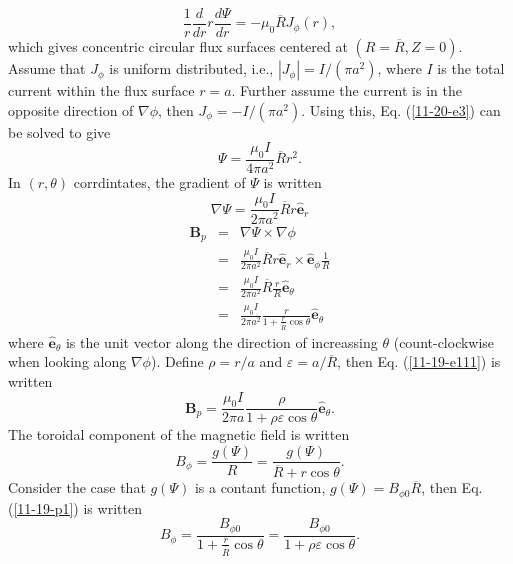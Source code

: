 \documentclass{article}
\begin{document}
\begin{equation}
  \label{11-20-e3} \frac{1}{r}  \frac{d}{d r} r \frac{d \Psi}{d r} = - \mu_0
  \overline{R} J_{\phi} (r),
\end{equation}
which gives concentric circular flux surfaces centered at $(R = \overline{R},
Z = 0)$. Assume that $J_{\phi}$ is uniform distributed, i.e., $|J_{\phi} | = I
/ (\pi a^2)$, where $I$ is the total current within the flux surface $r = a$.
Further assume the current is in the opposite direction of $\nabla \phi$, then
$J_{\phi} = - I / (\pi a^2)$. Using this, Eq. (\ref{11-20-e3}) can be solved
to give
\begin{equation}
  \label{11-21-4} \Psi = \frac{\mu_0 I}{4 \pi a^2} \overline{R} r^2 .
\end{equation}
In $(r, \theta)$ corrdintates, the gradient of $\Psi$ is written
\begin{equation}
  \nabla \Psi = \frac{\mu_0 I}{2 \pi a^2} \overline{R} r \hat{\mathbf{e}}_r
\end{equation}
\begin{eqnarray}
  \mathbf{B}_p & = & \nabla \Psi \times \nabla \phi \nonumber\\
  & = &  \frac{\mu_0 I}{2 \pi a^2} \overline{R} r \hat{\mathbf{e}}_r \times
  \hat{\mathbf{e}}_{\phi} \frac{1}{R} \nonumber\\
  & = & \frac{\mu_0 I}{2 \pi a^2} \overline{R} \frac{r}{R}
  \hat{\mathbf{e}}_{\theta} \nonumber\\
  & = & \frac{\mu_0 I}{2 \pi a^2} \frac{r}{1 + \frac{r}{\overline{R}} \cos
  \theta} \hat{\mathbf{e}}_{\theta}  \label{11-19-e111}
\end{eqnarray}
where $\hat{\mathbf{e}}_{\theta}$ is the unit vector along the direction of
increassing $\theta$ (count-clockwise when looking along $\nabla \phi$).
Define $\rho = r / a$ and $\varepsilon = a / \overline{R}$, then Eq.
(\ref{11-19-e111}) is written
\[ \mathbf{B}_p = \frac{\mu_0 I}{2 \pi a} \frac{\rho}{1 + \rho \varepsilon
   \cos \theta} \hat{\mathbf{e}}_{\theta} . \]
The toroidal component of the magnetic field is written
\begin{equation}
  \label{11-19-p1} B_{\phi} = \frac{g (\Psi)}{R} = \frac{g
  (\Psi)}{\overline{R} + r \cos \theta} .
\end{equation}
Consider the case that $g (\Psi)$ is a contant function, $g (\Psi) = B_{\phi
0} \overline{R}$, then Eq. (\ref{11-19-p1}) is written
\begin{equation}
  B_{\phi} = \frac{B_{\phi 0}}{1 + \frac{r}{\overline{R}} \cos \theta} =
  \frac{B_{\phi 0}}{1 + \rho \varepsilon \cos \theta} .
\end{equation}
\end{document}
